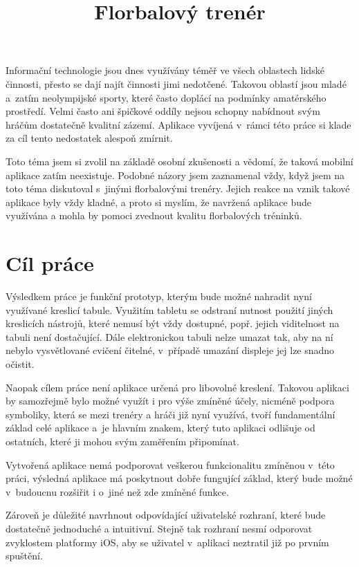 \documentclass[thesis=B,czech]{FITthesis}[2012/06/26]
\title{Florbalový trenér}
\begin{document}

\begin{introduction}
	Informační technologie jsou dnes využívány téměř ve všech oblastech lidské činnosti, přesto se dají najít činnosti jimi nedotčené. Takovou oblastí jsou mladé a~zatím neolympijské sporty, které často doplácí na podmínky amatérského prostředí. Velmi často ani špičkové oddíly nejsou schopny nabídnout svým hráčům dostatečně kvalitní zázemí. Aplikace vyvíjená v~rámci této práce si klade za cíl tento nedostatek alespoň zmírnit.

	Toto téma jsem si zvolil na základě osobní zkušenosti a vědomí, že taková mobilní aplikace zatím neexistuje. Podobné názory jsem zaznamenal vždy, když jsem na toto téma diskutoval s~jinými florbalovými trenéry. Jejich reakce na vznik takové aplikace byly vždy kladné, a proto si myslím, že navržená aplikace bude využívána a mohla by pomoci zvednout kvalitu florbalových tréninků.
\end{introduction}

\chapter{Cíl práce}
	Výsledkem práce je funkční prototyp, kterým bude možné nahradit nyní využívané kreslicí tabule. Využitím tabletu se odstraní nutnost použití jiných kreslicích nástrojů, které nemusí být vždy dostupné, popř. jejich viditelnost na tabuli není dostačující. Dále elektronickou tabuli nelze umazat tak, aby na ní nebylo vysvětlované cvičení čitelné, v~případě umazání displeje jej lze snadno očistit.

	Naopak cílem práce není aplikace určená pro libovolné kreslení. Takovou aplikaci by samozřejmě bylo možné využít i pro výše zmíněné účely, nicméně podpora symboliky, která se mezi trenéry a hráči již nyní využívá, tvoří fundamentální základ celé aplikace a~je hlavním znakem, který tuto aplikaci odlišuje od ostatních, které ji mohou svým zaměřením připomínat.

	Vytvořená aplikace nemá podporovat veškerou funkcionalitu zmíněnou v~této práci, výsledná aplikace má poskytnout dobře fungující základ, který bude možné v~budoucnu rozšiřit i o~jiné než zde zmíněné funkce.

	Zároveň je důležité navrhnout odpovídající uživatelské rozhraní, které bude dostatečně jednoduché a intuitivní. Stejně tak rozhraní nesmí odporovat zvyklostem platformy iOS, aby se uživatel v~aplikaci neztratil již po prvním spuštění.
\end{document}
